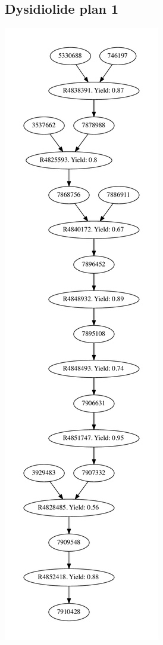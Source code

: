 \documentclass[a4paper,10pt,titlepage]{paper}
\begin{document}
\subsection{Dysidiolide plan 1}
\centering
\includegraphics[scale=0.43]{Synteseplaner/Dysidiolide/plan1.pdf}
\label{Appendix::Dysidiolide1}
\end{document}
